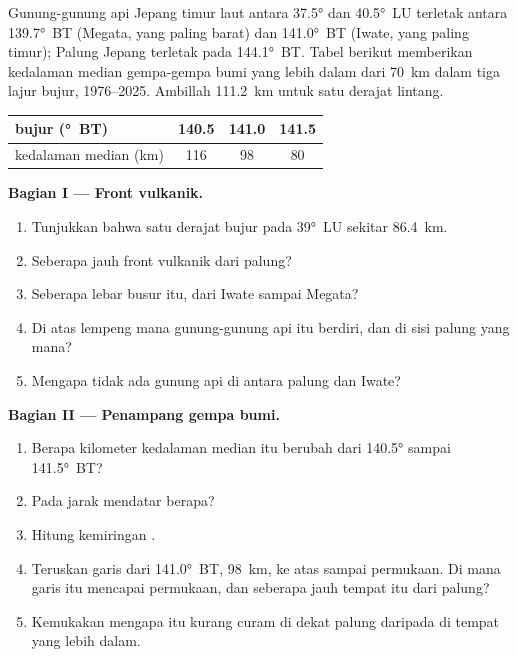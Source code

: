 \begin{problem}
\label{pb:g12:subduction-magmatism:1}
Gunung-gunung api Jepang timur laut antara \ang{37.5} dan \ang{40.5}~LU terletak
antara \ang{139.7}~BT (Megata, yang paling barat) dan \ang{141.0}~BT (Iwate, yang
paling timur); Palung Jepang terletak pada \ang{144.1}~BT. Tabel berikut
memberikan kedalaman median gempa-gempa bumi yang lebih dalam dari
\qty{70}{km} dalam tiga lajur bujur, 1976--2025. Ambillah \qty{111.2}{km} untuk
satu derajat lintang.

\begin{center}
\small
\begin{tabular}{|l|c|c|c|}
\hline
bujur (\unit{\degree}~BT) & 140.5 & 141.0 & 141.5 \\ \hline
kedalaman median (\unit{km}) & 116 & 98 & 80 \\ \hline
\end{tabular}
\end{center}

\medskip
\noindent\textbf{Bagian I --- Front vulkanik.}
\begin{enumerate}
  \item Tunjukkan bahwa satu derajat bujur pada \ang{39}~LU sekitar
        \qty{86.4}{km}.
  \item Seberapa jauh front vulkanik dari palung?
  \item Seberapa lebar busur itu, dari Iwate sampai Megata?
  \item Di atas lempeng mana gunung-gunung api itu berdiri, dan di sisi palung
        yang mana?
  \item Mengapa tidak ada gunung api di antara palung dan Iwate?
\end{enumerate}

\medskip
\noindent\textbf{Bagian II --- Penampang gempa bumi.}
\begin{enumerate}[resume]
  \item Berapa kilometer kedalaman median itu berubah dari \ang{140.5} sampai
        \ang{141.5}~BT?
  \item Pada jarak mendatar berapa?
  \item Hitung kemiringan .
  \item Teruskan garis dari \ang{141.0}~BT, \qty{98}{km}, ke atas sampai
        permukaan. Di mana garis itu mencapai permukaan, dan seberapa jauh
        tempat itu dari palung?
  \item Kemukakan mengapa  itu kurang curam di dekat palung daripada
        di tempat yang lebih dalam.
\end{enumerate}


\end{problem}
